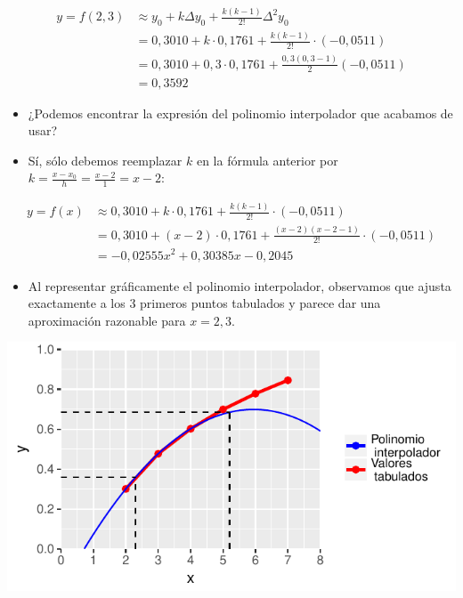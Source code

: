 \documentclass[openany]{book}
\providecommand{\tightlist}{%
  \setlength{\itemsep}{0pt}\setlength{\parskip}{0pt}}
\begin{document}
\[
\begin{aligned}
y = f(2,3) &\approx y_0 + k \Delta y_0 + \frac{k(k-1)}{2!}\Delta^2 y_0 \\
    & = 0,3010 + k \cdot 0,1761 + \frac{k(k-1)}{2!} \cdot (-0,0511) \\
  & = 0,3010 + 0,3 \cdot 0,1761 + \frac{0,3 (0,3-1)}{2} (-0,0511) \\
  & = 0,3592
\end{aligned}
\]

\begin{itemize}
\tightlist
\item
  ¿Podemos encontrar la expresión del polinomio interpolador que acabamos de usar?
\item
  Sí, sólo debemos reemplazar \(k\) en la fórmula anterior por \(k = \frac{x-x_0}{h} = \frac{x-2}{1} = x-2\):
\end{itemize}

\[
\begin{aligned}
y = f(x) &\approx 0,3010 + k \cdot 0,1761 + \frac{k(k-1)}{2!} \cdot (-0,0511) \\
    & = 0,3010 + (x-2) \cdot 0,1761 + \frac{(x-2)(x-2-1)}{2!} \cdot (-0,0511) \\
  & = -0,02555 x^2 + 0,30385 x - 0,2045
\end{aligned}
\]

\begin{itemize}
\tightlist
\item
  Al representar gráficamente el polinomio interpolador, observamos que ajusta exactamente a los 3 primeros puntos tabulados y parece dar una aproximación razonable para \(x = 2,3\).
\end{itemize}

\begin{center}\includegraphics[width=0.7\linewidth]{Plots/U4/Unidad4_g2} \end{center}
\end{document}
